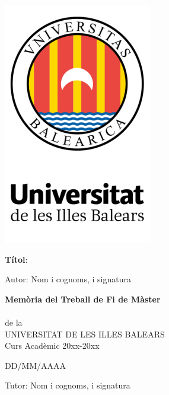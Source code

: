 \onecolumn
\begin{center}


\vspace*{1cm}
\includegraphics[scale=1]{figures/logo.png}

\vspace*{2.2cm}
\LARGE {\textbf{T\'itol}:} \\
\vspace*{1cm}

\noindent \Large{Autor: Nom i cognoms, i signatura\\}
\vspace*{1.5cm}

\noindent \large \textbf{Memòria del Treball de Fi de Màster} \\
\vspace*{0.5cm}
 \\
\noindent \large {de la} \\
\noindent \large {UNIVERSITAT DE LES ILLES BALEARS} \\
\vspace*{0.5cm}
\noindent \large {Curs Acadèmic 20xx-20xx} \\
\vspace*{1cm}

\vspace*{0.75cm}
\noindent \Large DD/MM/AAAA

\vspace*{1cm}
\noindent \large{Tutor: Nom i cognoms, i signatura\\}




\end{center}
\twocolumn
\newpage